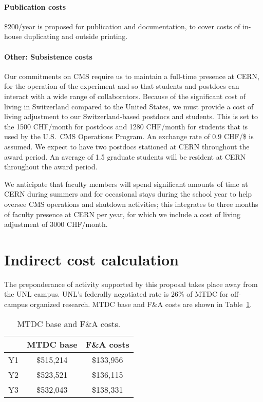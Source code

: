 \documentclass[11pt]{article}
\begin{document}
\paragraph{Publication costs} \$200/year is proposed for publication and
documentation, to cover costs of in-house duplicating and outside printing.

\paragraph{Other: Subsistence costs} Our commitments on CMS require us to
maintain a full-time presence at CERN, for the operation of the experiment
and so that students and postdocs can interact with a wide range of
collaborators.  Because of the significant cost of living in Switzerland
compared to the United States, we must provide a cost of living adjustment
to our Switzerland-based postdocs and students.  This is set to the 1500
CHF/month for postdocs and 1280 CHF/month for students that is used by the
U.S.~CMS Operations Program.  An exchange rate of 0.9 CHF/\$ is assumed.
We expect to have two postdocs stationed at CERN throughout the award
period.  An average of 1.5 graduate students will be resident at CERN
throughout the award period.

We anticipate that faculty members will spend significant amounts of time
at CERN during summers and for occasional stays during the school year to
help oversee CMS operations and shutdown activities; this integrates to three
months of faculty presence at CERN per year, for which we include a cost of
living adjustment of 3000 CHF/month.

\section{Indirect cost calculation} The preponderance of activity supported
by this proposal takes place away from the UNL campus. UNL's federally
negotiated rate is 26\% of MTDC for off-campus organized research.  MTDC base and F\&A costs are shown in Table~\ref{tab:MTDC}.

\begin{table}[h]
\centering
\begin{tabular}{ccc}\hline
 & MTDC base  & F\&A costs \\\hline
Y1 & \$515,214 & \$133,956 \\ 
Y2 & \$523,521 & \$136,115 \\ 
Y3 & \$532,043 & \$138,331 \\ \hline
\end{tabular}
\caption{MTDC base and F\&A costs.} 
\label{tab:MTDC}
\end{table}
\end{document}
